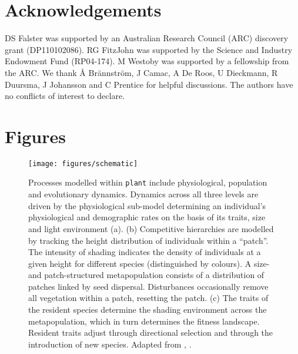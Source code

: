\documentclass[a4paper,11pt]{article}
\newcommand{\plant}{\texttt{plant}}
\begin{document}
\section{Acknowledgements}

DS Falster was supported by an Australian Research Council (ARC)
discovery grant (DP110102086). RG FitzJohn was supported by the
Science and Industry Endowment Fund (RP04-174). M Westoby was
supported by a fellowship from the ARC. We thank {\AA}
Br{\"a}nnstr{\"o}m, J Camac, A De Roos, U Dieckmann, R Duursma, J
Johansson and C Prentice for helpful discussions. The authors have no 
conflicts of interest to declare.

\clearpage


\clearpage

\section{Figures}\label{figures}

\begin{figure}[h!]
\centering
\texttt{[image: figures/schematic]}

\caption{Processes modelled within {\plant} include physiological, population and
evolutionary dynamics.
Dynamics across all three levels are driven by the
physiological sub-model determining an individual's physiological and
demographic rates on the basis of its traits, size and light environment (a).
(b) Competitive hierarchies  are modelled by tracking the height distribution of
individuals within a ``patch''. The intensity
of shading indicates the density of individuals at a given height for
different species (distinguished by colours). A size- and patch-structured
metapopulation consists of a distribution of patches linked by seed dispersal.
Disturbances occasionally remove all vegetation within a patch, resetting the
patch. (c) The traits of the resident species determine the shading environment
across the metapopulation, which in turn determines the fitness landscape.
Resident traits adjust through directional selection
and through the introduction of new species. Adapted from
\citet{Falster-2011}, \citet{Falster-2015}. }

\label{fig:schematic}
\end{figure}

\newpage
\end{document}
